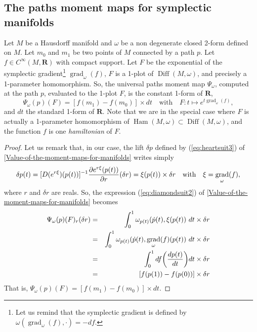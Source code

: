\documentclass[10pt,reqno,twoside]{amsart}
\newcommand{\qmbox}[1]{\quad\mbox{#1}\quad}
\newcommand{\RR}{\mathbf{R}}
\DeclareMathOperator{\Diff}{Diff}
\DeclareMathOperator{\Ham}{Ham}
\DeclareMathOperator{\grad}{grad}
\newcommand{\Cinfty}{C^\infty}
\newcommand{\D}{D}
\theoremstyle{plain}
\theoremstyle{definition}
\newcommand{\article}[1]{\subsection{#1}}
\begin{document}
  \article{The paths moment maps for symplectic manifolds}
  \label{The-paths-moment-maps-for-symplectic-manifolds}
  Let $M$ be a Hausdorff manifold and $\omega$ be a non degenerate closed 2-form defined on $M$.
  Let $m_0$ and $m_1$ be two points of $M$ connected by a path $p$.
  Let $f \in \Cinfty(M,\RR)$ with compact support.
  Let $F$ be the exponential of the symplectic gradient\footnote{Let us remind that the symplectic gradient is defined by $\omega(\grad_\omega(f),\cdot) = -df$.} $\grad_\omega(f)$,
  $F$ is a 1-plot of $\Diff(M,\omega)$,
  and precisely a 1-parameter homomorphism.
  So,
  the universal paths moment map $\Psi_\omega$,
  computed at the path $p$,
  evaluated to the 1-plot $F$,
  is the constant 1-form of $\RR$,
  $$
    \Psi_\omega(p)(F) = [f(m_1) -f(m_0)] \times dt \qmbox{with} F :t \mapsto e^{t \grad_\omega(f)},
    $$
  and $dt$ the standard 1-form of $\RR$.
  Note that we are in the special case where $F$ is actually a 1-parameter homomorphism of $\Ham(M,\omega) \subset \Diff(M,\omega)$,
  and the function $f$ is one {\em hamiltonian} of $F$.
  
  \begin{proof}
    Let us remark that,
    in our case,
    the lift $\delta p$ defined by (\ref{eq:heartsuit3}) of \ref{Value-of-the-moment-maps-for-manifolds} writes simply
    $$
      \delta p(t) = [\D(e^{r \xi})(p(t))]^{-1} {\partial e^{r \xi}(p(t)) \over \partial r} (\delta r) = \xi(p(t)) \times \delta r \qmbox{with} \xi = \grad_\omega(f),
      $$
    where $r$ and $\delta r$ are reals.
    So,
    the expression (\ref{eq:diamondsuit2}) of \ref{Value-of-the-moment-maps-for-manifolds} becomes
    \begin{eqnarray*}
      \Psi_\omega(p)(F)_r(\delta r) & = & \int_0^1 \omega_{p(t)}(\dot p(t), \xi(p(t)) \ dt \times \delta r \\
      & = & \int_0^1 \omega_{p(t)}(\dot p(t), \grad_\omega(f)(p(t)) \ dt \times \delta r\\
      & = & \int_0^1 df\bigg({d p(t) \over dt} \bigg) dt \times \delta r\\
      & = & [f(p(1)) - f(p(0))] \times \delta r
    \end{eqnarray*}
    That is,
    $\Psi_\omega(p)(F) = [f(m_1) -f(m_0)] \times dt$.
  \end{proof}
  
\end{document}
